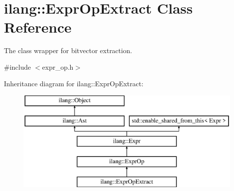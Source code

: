 \hypertarget{classilang_1_1_expr_op_extract}{}\section{ilang\+:\+:Expr\+Op\+Extract Class Reference}
\label{classilang_1_1_expr_op_extract}


The class wrapper for bitvector extraction.  




{\ttfamily \#include $<$expr\+\_\+op.\+h$>$}

Inheritance diagram for ilang\+:\+:Expr\+Op\+Extract\+:\begin{figure}[H]
\begin{center}
\leavevmode
\includegraphics[height=5.000000cm]{classilang_1_1_expr_op_extract}
\end{center}
\end{figure}
